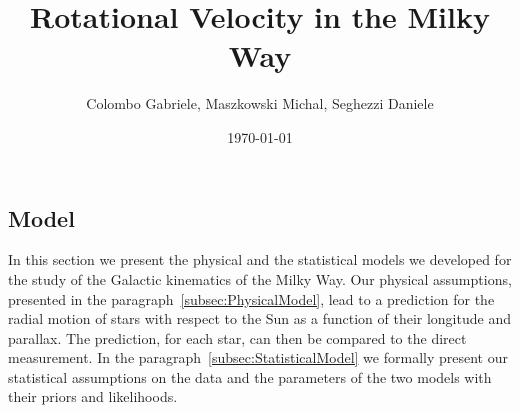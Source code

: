 \documentclass{article}
\title{Rotational Velocity in the Milky Way}
\author{Colombo Gabriele, Maszkowski Michal, Seghezzi Daniele}
\date{\today}
\begin{document}
\maketitle



\begin{multicols}{2}

\section{Model}
In this section we present the physical and the statistical models we developed for the study of the Galactic kinematics of the Milky Way. Our physical assumptions, presented in the paragraph~\ref{subsec:PhysicalModel}, lead to a prediction for the radial motion of stars with respect to the Sun as a function of their longitude and parallax. The prediction, for each star, can then be compared to the direct measurement. In the paragraph~\ref{subsec:StatisticalModel} we formally present our statistical assumptions on the data and the parameters of the two models with their priors and likelihoods.





\end{multicols} 


\printbibliography

\end{document}
